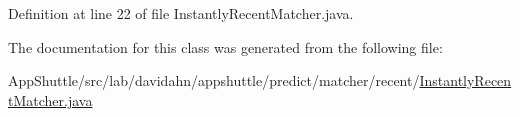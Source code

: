 \-Definition at line 22 of file \-Instantly\-Recent\-Matcher.\-java.



\-The documentation for this class was generated from the following file\-:\begin{DoxyCompactItemize}
\item 
\-App\-Shuttle/src/lab/davidahn/appshuttle/predict/matcher/recent/\hyperlink{_instantly_recent_matcher_8java}{\-Instantly\-Recent\-Matcher.\-java}\end{DoxyCompactItemize}
